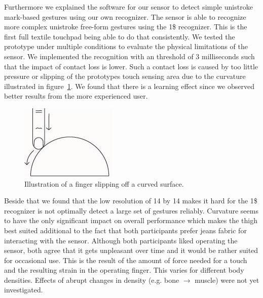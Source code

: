 Furthermore we explained the software for our sensor to detect simple unistroke mark-based gestures using our own recognizer. The sensor is able to recognize more complex unistroke free-form gestures using the 1\$ recognizer. This is the first full textile touchpad being able to do that consistently. We tested the prototype under multiple conditions to evaluate the physical limitations of the sensor. We implemented the recognition with an threshold of 3 milliseconds such that the impact of contact loss is lower. Such a contact loss is caused by too little pressure or slipping of the prototypes touch sensing area due to the curvature illustrated in figure~\ref{fig:curvatureillustration}. We found that there is a learning effect since we observed better results from the more experienced user. \\\begin{figure}
\includegraphics[scale=1]{images/curvatureillustration}
\caption{Illustration of a finger slipping off a curved surface.}
\label{fig:curvatureillustration}
\end{figure}
Beside that we found that the low resolution of 14 by 14 makes it hard for the 1\$ recognizer is not optimally detect a large set of gestures reliably. Curvature seems to have the only significant impact on overall performance which makes the thigh best suited additional to the fact that both participants prefer jeans fabric for interacting with the sensor. Although both participants liked operating the sensor, both agree that it gets unpleasant over time and it would be rather suited for occasional use. This is the result of the amount of force needed for a touch and the resulting strain in the operating finger. This varies for different body densities. Effects of abrupt changes in density (e.g. bone $\rightarrow$ muscle) were not yet investigated.

